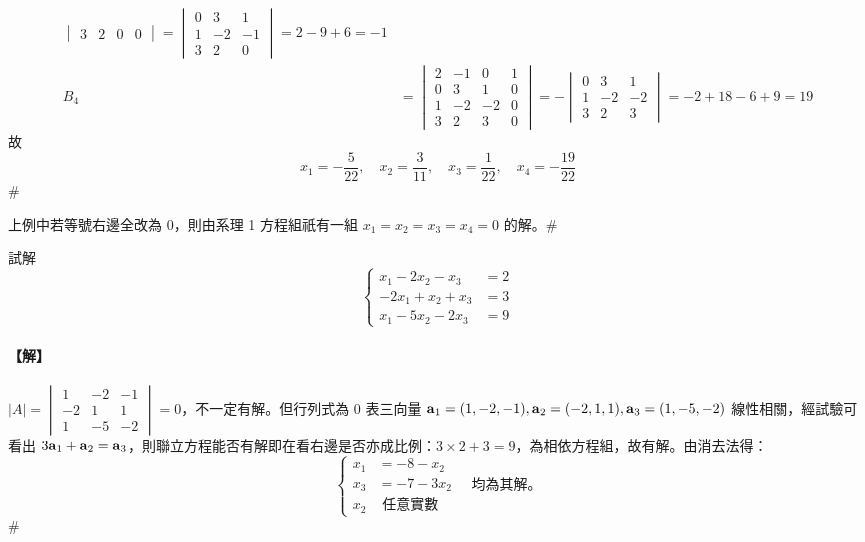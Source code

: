 \begin{align*}
\begin{vmatrix}
3 & 2 & 0 & 0
\end{vmatrix} = \begin{vmatrix}
0 & 3 & 1 \\
1 & -2 & -1 \\
3 & 2 & 0
\end{vmatrix} = 2-9+6 = -1 \\
B_4 &= \begin{vmatrix}
2 & -1 & 0 & 1 \\
0 & 3 & 1 & 0 \\
1 & -2 & -2 & 0 \\
3 & 2 & 3 & 0
\end{vmatrix} = - \begin{vmatrix}
0 & 3 & 1 \\
1 & -2 & -2 \\
3 & 2 & 3
\end{vmatrix} = -2+18-6+9 = 19
\end{align*}
故
\[ x_1 = -\dfrac{5}{22}, \quad x_2 = \dfrac{3}{11}, \quad x_3 = \dfrac{1}{22}, \quad x_4 = -\dfrac{19}{22} \]\hfill$\#$

\begin{example}\label{ex:b6-1-42}
上例中若等號右邊全改為 0，則由系理 1 方程組祇有一組 $x_1=x_2=x_3=x_4=0$ 的解。\hfill$\#$
\end{example}

\begin{example}\label{ex:b6-1-43}
試解
\[ \left\{\begin{aligned}
x_1 - 2x_2 - x_3 &= 2 \\
-2x_1 + x_2 + x_3 &= 3 \\
x_1 - 5x_2 - 2x_3 &= 9
\end{aligned}\right. \]
\end{example}

\paragraph{【解】}
$|A| = \begin{vmatrix} 1 & -2 & -1 \\ -2 & 1 & 1 \\ 1 & -5 & -2 \end{vmatrix} = 0$，不一定有解。但行列式為 0 表三向量 $\boldsymbol{\mathbf{a}}_1=(1, -2, -1), \boldsymbol{\mathbf{a}}_2=(-2, 1, 1), \boldsymbol{\mathbf{a}}_3=(1, -5, -2)$ 線性相關，經試驗可看出 $3\boldsymbol{\mathbf{a}}_1 + \boldsymbol{\mathbf{a}}_2 = \boldsymbol{\mathbf{a}}_3$，則聯立方程能否有解即在看右邊是否亦成比例：$3 \times 2 + 3 = 9$，為相依方程組，故有解。由消去法得：
\[ \left\{\begin{aligned}
x_1 &= -8 - x_2 \\
x_3 &= -7 - 3x_2 \\
x_2 &\text{ 任意實數}
\end{aligned}\right. \quad \text{均為其解。} \]\hfill$\#$

